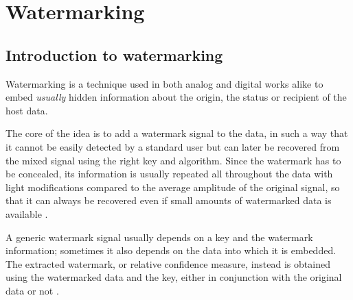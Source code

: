 \setlength{\parindent}{0pt}
\setlength{\parskip}{2pt}
\chapter{Watermarking}
\section{Introduction to watermarking}
Watermarking is a technique used in both analog and digital works alike to embed \emph{usually} hidden information about the origin, the status or recipient of the host data. 

The core of the idea is to add a watermark signal to the data, in such a way that it cannot be easily detected by a standard user but can later be recovered from the mixed signal using the right key and algorithm. Since the watermark has to be concealed, its information is usually repeated all throughout the data with light modifications compared to the average amplitude of the original signal, so that it can always be recovered even if small amounts of watermarked data is available \cite[page 4, “Basic Watermarking Principles”]{hartung}.

A generic watermark signal usually depends on a key and the watermark information; sometimes it also depends on the data into which it is embedded. The extracted watermark, or relative confidence measure, instead is obtained using the watermarked data and the key, either in conjunction with the original data or not \cite[page 5, figs. 1-2, formulas 1-5]{hartung}.

